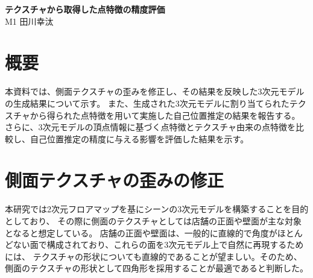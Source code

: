 \documentclass[]{jarticle}          %
\begin{document}

\vspace*{2ex}
\begin{center}
 {\Large \bf テクスチャから取得した点特徴の精度評価}\\ %
 \vspace*{5mm}
 {\large M1 田川幸汰}%
\end{center}





\section{概要}
本資料では、側面テクスチャの歪みを修正し、その結果を反映した3次元モデルの生成結果について示す。
また、生成された3次元モデルに割り当てられたテクスチャから得られた点特徴を用いて実施した自己位置推定の結果を報告する。
さらに、3次元モデルの頂点情報に基づく点特徴とテクスチャ由来の点特徴を比較し、自己位置推定の精度に与える影響を評価した結果を示す。

\section{側面テクスチャの歪みの修正}
本研究では2次元フロアマップを基にシーンの3次元モデルを構築することを目的としており、
その際に側面のテクスチャとしては店舗の正面や壁面が主な対象となると想定している。
店舗の正面や壁面は、一般的に直線的で角度がほとんどない面で構成されており、これらの面を3次元モデル上で自然に再現するためには、
テクスチャの形状についても直線的であることが望ましい。そのため、側面のテクスチャの形状として四角形を採用することが最適であると判断した。
\end{document}
